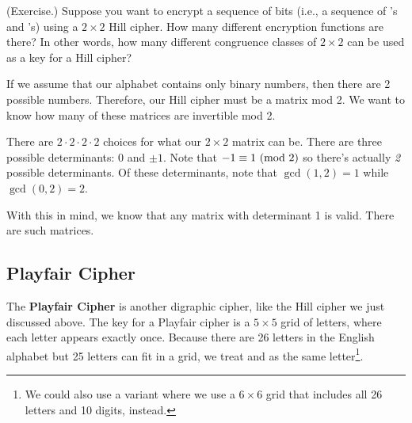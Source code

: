 \documentclass[letterpaper]{article}
\newcommand{\0}{\mathbf{0}}
\begin{document}
\begin{mdframed}
    (Exercise.) Suppose you want to encrypt a sequence of bits (i.e., a sequence of 's and 's) using a $2 \times 2$ Hill cipher. How many different encryption functions are there? In other words, how many different congruence classes of $2 \times 2$ can be used as a key for a Hill cipher? 

    \begin{mdframed}
        If we assume that our alphabet contains only binary numbers, then there are 2 possible numbers. Therefore, our Hill cipher must be a matrix mod 2. We want to know how many of these matrices are invertible mod 2. 

        \bigskip 

        There are $2 \cdot 2 \cdot 2 \cdot 2$ choices for what our $2 \times 2$ matrix can be. There are three possible determinants: $0$ and $\pm 1$. Note that $-1 \equiv 1 \ (\mathrm{mod}\ 2)$ so there's actually \emph{2} possible determinants. Of these determinants, note that $\gcd(1, 2) = 1$ while $\gcd(0, 2) = 2$.
        
        \bigskip 

        With this in mind, we know that any matrix with determinant 1 is valid. There are  such matrices.
    \end{mdframed}
\end{mdframed}

\subsection{Playfair Cipher}
The \textbf{Playfair Cipher} is another digraphic cipher, like the Hill cipher we just discussed above. The key for a Playfair cipher is a $5 \times 5$ grid of letters, where each letter appears exactly once. Because there are 26 letters in the English alphabet but 25 letters can fit in a grid, we treat  and  as the same letter\footnote{We could also use a variant where we use a $6 \times 6$ grid that includes all 26 letters and 10 digits, instead.}. 

\bigskip 
\end{document}
